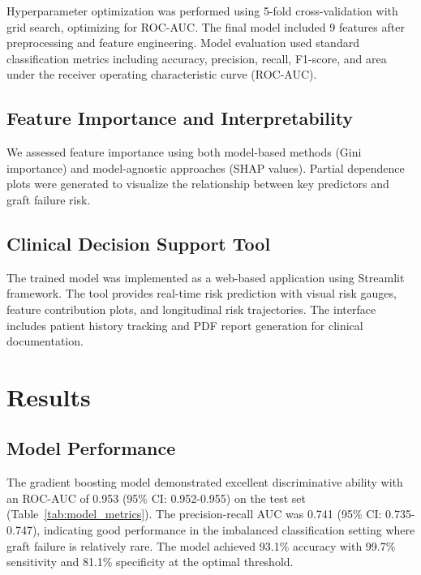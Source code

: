 \documentclass[12pt,a4paper]{article}
\begin{document}
Hyperparameter optimization was performed using 5-fold cross-validation with grid search, optimizing for ROC-AUC. The final model included 9 features after preprocessing and feature engineering. Model evaluation used standard classification metrics including accuracy, precision, recall, F1-score, and area under the receiver operating characteristic curve (ROC-AUC).

\subsection{Feature Importance and Interpretability}

We assessed feature importance using both model-based methods (Gini importance) and model-agnostic approaches (SHAP values). Partial dependence plots were generated to visualize the relationship between key predictors and graft failure risk.

\subsection{Clinical Decision Support Tool}

The trained model was implemented as a web-based application using Streamlit framework. The tool provides real-time risk prediction with visual risk gauges, feature contribution plots, and longitudinal risk trajectories. The interface includes patient history tracking and PDF report generation for clinical documentation.

\section{Results}

\subsection{Model Performance}

The gradient boosting model demonstrated excellent discriminative ability with an ROC-AUC of 0.953 (95\% CI: 0.952-0.955) on the test set (Table~\ref{tab:model_metrics}). The precision-recall AUC was 0.741 (95\% CI: 0.735-0.747), indicating good performance in the imbalanced classification setting where graft failure is relatively rare. The model achieved 93.1\% accuracy with 99.7\% sensitivity and 81.1\% specificity at the optimal threshold.
\end{document}
